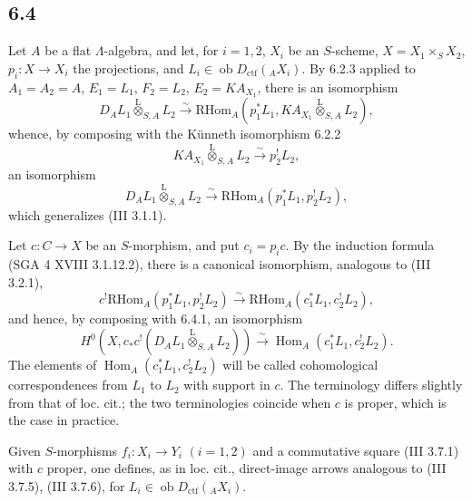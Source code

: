 \documentclass[11pt]{article}
\DeclareMathOperator{\Hom}{Hom}
\providecommand{\RHom}{\mathrm{RHom}}
\providecommand{\lten}{\overset{\mathrm L}{\otimes}}
\providecommand{\Ob}{\operatorname{ob}}
\providecommand{\RHom}{\mathrm{RHom}}
\providecommand{\Hom}{\operatorname{Hom}}
\providecommand{\lten}{\overset{\mathrm L}{\otimes}}
\providecommand{\RHom}{\mathrm R\mathcal{H}om}
\providecommand{\lten}{\overset{\mathrm L}{\otimes}}
\providecommand{\Ob}{\operatorname{ob}}
\providecommand{\lten}{\overset{\mathrm L}{\otimes}}
\providecommand{\lten}{\overset{\mathrm L}{\otimes}}
\providecommand{\Ob}{\operatorname{Ob}}
\providecommand{\lten}{\overset{\mathrm L}{\otimes}}
\providecommand{\RHom}{\mathrm{RHom}}
\begin{document}
\subsection*{6.4}
Let $A$ be a flat $\Lambda$-algebra, and let, for $i=1,2$, $X_i$ be an $S$-scheme, $X=X_1\times_SX_2$, $p_i:X\to X_i$ the projections, and $L_i\in\Ob D_{\mathrm{ctf}}({}_AX_i)$. By 6.2.3 applied to $A_1=A_2=A$, $E_1=L_1$, $F_2=L_2$, $E_2=KA_{X_1}$, there is an isomorphism
\[
D_A L_1\lten_{S,A}L_2
\xrightarrow{\sim}
\RHom_A(p_1^*L_1,KA_{X_1}\lten_{S,A}L_2),
\]
whence, by composing with the Künneth isomorphism 6.2.2
\[
KA_{X_1}\lten_{S,A}L_2\xrightarrow{\sim}p_2^!L_2,
\]
an isomorphism
\begin{equation}
D_AL_1\lten_{S,A}L_2
\xrightarrow{\sim}
\RHom_A(p_1^*L_1,p_2^!L_2),
\tag{6.4.1}
\end{equation}
which generalizes (III 3.1.1).

Let $c:C\to X$ be an $S$-morphism, and put $c_i=p_ic$. By the induction formula (SGA 4 XVIII 3.1.12.2), there is a canonical isomorphism, analogous to (III 3.2.1),
\begin{equation}
c^!\RHom_A(p_1^*L_1,p_2^!L_2)
\xrightarrow{\sim}
\RHom_A(c_1^*L_1,c_2^!L_2),
\tag{6.4.2}
\end{equation}
and hence, by composing with 6.4.1, an isomorphism
\begin{equation}
H^0(X,c_*c^!(D_AL_1\lten_{S,A}L_2))
\xrightarrow{\sim}
\Hom_A(c_1^*L_1,c_2^!L_2).
\tag{6.4.3}
\end{equation}
The elements of $\Hom_A(c_1^*L_1,c_2^!L_2)$ will be called cohomological correspondences from $L_1$ to $L_2$ with support in $c$. The terminology differs slightly from that of loc. cit.; the two terminologies coincide when $c$ is proper, which is the case in practice.

Given $S$-morphisms $f_i:X_i\to Y_i$ $(i=1,2)$ and a commutative square (III 3.7.1) with $c$ proper, one defines, as in loc. cit., direct-image arrows analogous to (III 3.7.5), (III 3.7.6), for $L_i\in\Ob D_{\mathrm{ctf}}({}_AX_i)$.
\end{document}
